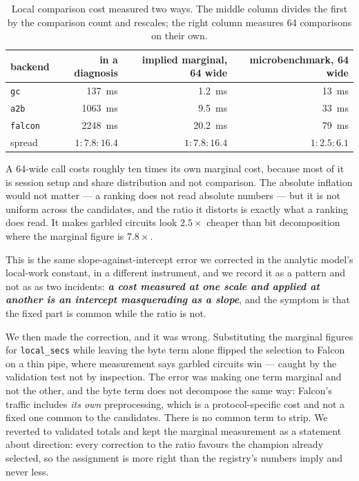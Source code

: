 \documentclass[11pt]{article}
\newcommand{\ib}[1]{\textbf{\emph{#1}}}
\newcommand{\bt}[1]{\texttt{#1}}
\begin{document}
\begin{table}[htb]
\centering
\small
\begin{tabular}{@{}lrrr@{}}
\toprule
backend & in a diagnosis & implied marginal, 64 wide & microbenchmark, 64 wide \\
\midrule
\bt{gc} & \SI{137}{\milli\second} & \SI{1.2}{\milli\second} & \SI{13}{\milli\second} \\
\bt{a2b} & \SI{1063}{\milli\second} & \SI{9.5}{\milli\second} & \SI{33}{\milli\second} \\
\bt{falcon} & \SI{2248}{\milli\second} & \SI{20.2}{\milli\second} & \SI{79}{\milli\second} \\
\midrule
spread & $1 : 7.8 : 16.4$ & $1 : 7.8 : 16.4$ & $1 : 2.5 : 6.1$ \\
\bottomrule
\end{tabular}
\caption{Local comparison cost measured two ways. The middle column divides the first by the
comparison count and rescales; the right column measures \num{64} comparisons on their own.}
\label{tab:marginal}
\end{table}

A \num{64}-wide call costs roughly ten times its own marginal cost, because most of it is session setup and share distribution and not comparison. The absolute inflation would not matter --- a
ranking does not read absolute numbers --- but it is not uniform across the candidates, and the
ratio it distorts is exactly what a ranking does read. It makes garbled circuits look
$2.5\times$ cheaper than bit decomposition where the marginal figure is $7.8\times$.

This is the same slope-against-intercept error we corrected in the analytic model's local-work
constant, in a different instrument, and we record it as a pattern and not as as two incidents:
\ib{a cost measured at one scale and applied at another is an intercept masquerading as a slope},
and the symptom is that the fixed part is common while the ratio is not.

We then made the correction, and it was wrong. Substituting the marginal figures for
\bt{local\_secs} while leaving the byte term alone flipped the selection to Falcon on a thin pipe,
where measurement says garbled circuits win --- caught by the validation test not by
inspection. The error was making one term marginal and not the other, and the byte term does not
decompose the same way: Falcon's traffic includes \emph{its own} preprocessing, which is a
protocol-specific cost and not a fixed one common to the candidates. There is no common term to
strip. We reverted to validated totals and kept the marginal measurement as a statement about
direction: every correction to the ratio favours the champion already selected, so the assignment
is more right than the registry's numbers imply and never less.
\end{document}
